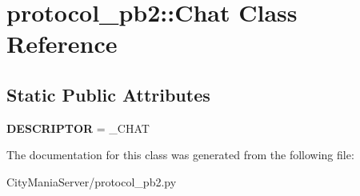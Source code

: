 \hypertarget{classprotocol__pb2_1_1Chat}{
\section{protocol\_\-pb2::Chat Class Reference}
\label{classprotocol__pb2_1_1Chat}
}
\subsection*{Static Public Attributes}
\begin{DoxyCompactItemize}
\item 
\hypertarget{classprotocol__pb2_1_1Chat_a646170d301543c098433baeafee80797}{
{\bfseries DESCRIPTOR} = \_\-CHAT}
\label{classprotocol__pb2_1_1Chat_a646170d301543c098433baeafee80797}

\end{DoxyCompactItemize}


The documentation for this class was generated from the following file:\begin{DoxyCompactItemize}
\item 
CityManiaServer/protocol\_\-pb2.py\end{DoxyCompactItemize}
